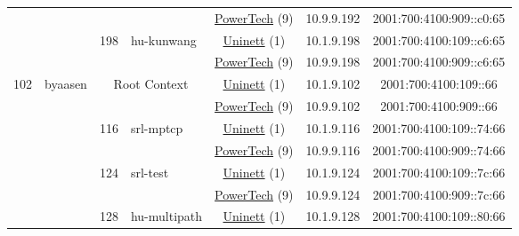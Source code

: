 \begin{small}
\begin{center}
\begin{longtable}{|c|c|c|c|c|c|c|c|}
  &  &  &  & \multicolumn{2}{|c|}{\tiny{\href{http://www.powertech.no}{PowerTech} (9)}} & \tiny{10.9.9.192} & \tiny{2001:700:4100:909::c0:65} \\* \cline{3-3}\cline{4-4}\cline{5-5}\cline{6-6}\cline{7-7}\cline{8-8}
  &  & \multirow{2}{*}{\tiny{198}} & \multicolumn{1}{|l|}{\multirow{2}{*}{\tiny{hu-kunwang}}} & \multicolumn{2}{|c|}{\tiny{\href{https://www.uninett.no}{Uninett} (1)}} & \tiny{10.1.9.198} & \tiny{2001:700:4100:109::c6:65} \\* \cline{5-5}\cline{6-6}\cline{7-7}\cline{8-8}
  &  &  &  & \multicolumn{2}{|c|}{\tiny{\href{http://www.powertech.no}{PowerTech} (9)}} & \tiny{10.9.9.198} & \tiny{2001:700:4100:909::c6:65} \\ \hline
 \multirow{22}{*}{\tiny{102}} & \multicolumn{1}{|l|}{\multirow{22}{*}{\tiny{byaasen}}} & \multicolumn{2}{|c|}{\multirow{2}{*}{\tiny{Root Context}}} & \multicolumn{2}{|c|}{\tiny{\href{https://www.uninett.no}{Uninett} (1)}} & \tiny{10.1.9.102} & \tiny{2001:700:4100:109::66} \\* \cline{5-5}\cline{6-6}\cline{7-7}\cline{8-8}
  &  & \multicolumn{2}{|c|}{} & \multicolumn{2}{|c|}{\tiny{\href{http://www.powertech.no}{PowerTech} (9)}} & \tiny{10.9.9.102} & \tiny{2001:700:4100:909::66} \\* \cline{3-3}\cline{4-4}\cline{5-5}\cline{6-6}\cline{7-7}\cline{8-8}
  &  & \multirow{2}{*}{\tiny{116}} & \multicolumn{1}{|l|}{\multirow{2}{*}{\tiny{srl-mptcp}}} & \multicolumn{2}{|c|}{\tiny{\href{https://www.uninett.no}{Uninett} (1)}} & \tiny{10.1.9.116} & \tiny{2001:700:4100:109::74:66} \\* \cline{5-5}\cline{6-6}\cline{7-7}\cline{8-8}
  &  &  &  & \multicolumn{2}{|c|}{\tiny{\href{http://www.powertech.no}{PowerTech} (9)}} & \tiny{10.9.9.116} & \tiny{2001:700:4100:909::74:66} \\* \cline{3-3}\cline{4-4}\cline{5-5}\cline{6-6}\cline{7-7}\cline{8-8}
  &  & \multirow{2}{*}{\tiny{124}} & \multicolumn{1}{|l|}{\multirow{2}{*}{\tiny{srl-test}}} & \multicolumn{2}{|c|}{\tiny{\href{https://www.uninett.no}{Uninett} (1)}} & \tiny{10.1.9.124} & \tiny{2001:700:4100:109::7c:66} \\* \cline{5-5}\cline{6-6}\cline{7-7}\cline{8-8}
  &  &  &  & \multicolumn{2}{|c|}{\tiny{\href{http://www.powertech.no}{PowerTech} (9)}} & \tiny{10.9.9.124} & \tiny{2001:700:4100:909::7c:66} \\* \cline{3-3}\cline{4-4}\cline{5-5}\cline{6-6}\cline{7-7}\cline{8-8}
  &  & \multirow{2}{*}{\tiny{128}} & \multicolumn{1}{|l|}{\multirow{2}{*}{\tiny{hu-multipath}}} & \multicolumn{2}{|c|}{\tiny{\href{https://www.uninett.no}{Uninett} (1)}} & \tiny{10.1.9.128} & \tiny{2001:700:4100:109::80:66} \\* \cline{5-5}\cline{6-6}\cline{7-7}\cline{8-8}

\end{longtable}
\end{center}
\end{small}
